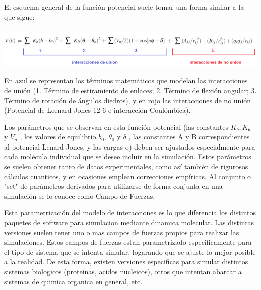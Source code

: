 \documentclass[a4paper,10pt]{report}
\begin{document}
El esquema general de la función potencial suele tomar una forma similar a la que sigue: \\ \\ 
\includegraphics[keepaspectratio, width=1.0\textwidth]{img/ecPotencialAmber.png}
\vspace{2pt}

En azul se representan los términos matemáticos que modelan las interacciones de unión (1. Término de estiramiento de enlaces; 2. Término de flexión angular; 3. Término de rotación de ángulos diedros), y en rojo
las interacciones de no unión (Potencial de Leenard-Jones 12-6 e interacción Coulómbica).

Los parámetros que se observan en esta función potencial (las constantes $K_b, K_{\theta}$ y $V_n$ , los valores de equilibrio $b_0$, $\theta_0$ y $\delta$ , 
las constantes A y B correspondientes al potencial Lenard-Jones, y las cargas q) deben ser ajustados especialmente para cada molécula individual que se desee incluir en la 
simulación. Estos parámetros se suelen obtener tanto de datos experimentales, como así también de rigurosos cálculos cuanticos, y en ocasiones emplean correcciones empíricas.
Al conjunto o "set" de parámetros derivados para utilizarse de forma conjunta en una simulación se lo conoce como Campo de Fuerzas.

Esta parametrización del modelo de interacciones es lo que diferencia los distintos paquetes de software para simulacion mediante dinamica molecular. 
Las distintas versiones suelen tener uno o mas campos de fuerzas propios para realizar las simulaciones. 
Estos campos de fuerzas estan parametrizado especificamente para el tipo de sistema que se intenta simular, logarando que se ajuste lo mejor posible a la realidad. De esta forma, existen versiones especificas para simular distintos sistemas biologicos (proteinas, acidos nucleicos), otros que intentan abarcar a sistemas de quimica organica en general, etc.
\end{document}
